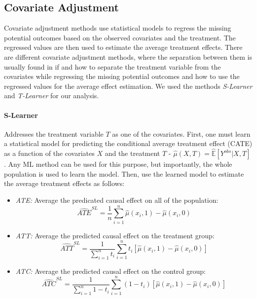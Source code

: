 \documentclass{article}
\begin{document}

\subsection{Covariate Adjustment}
Covariate adjustment methods use statistical models to regress the missing potential outcomes based on the observed covariates and the treatment. The regressed values are then used to estimate the average treatment effects.
There are different covariate adjustment methods, where the separation between them is usually found in if and how to separate the treatment variable from the covariates while regressing the missing potential outcomes and how to use the regressed values for the average effect estimation. We used the methods \emph{S-Learner} and \emph{T-Learner} for our analysis.
\paragraph{S-Learner} Addresses the treatment variable $T$ as one of the covariates. First, one must learn a statistical model for predicting the conditional average treatment effect (CATE) as a function of the covariates $X$ and the treatment $T$ - $\hat{\mu}(X, T) = \hat{\mathbb{E}}[Y^{obs} | X, T]$. Any ML method can be used for this purpose, but importantly, the whole population is used to learn the model. Then, use the learned model to estimate the average treatment effects as follows:

\begin{itemize}
    \item \textit{ATE:} Average the predicated causal effect on all of the population:
    \[
    \widehat{ATE}^{SL} = \frac{1}{n} \sum_{i=1}^{n} \hat{\mu}(x_i, 1) - \hat{\mu}(x_i, 0)
    \]
    \item \textit{ATT:} Average the predicted causal effect on the treatment group:
    \[
    \widehat{ATT}^{SL} = \frac{1}{\sum_{i=1}^{n} t_i} \sum_{i=1}^{n} t_i \left[ \hat{\mu}(x_i, 1) - \hat{\mu}(x_i, 0) \right] 
    \]
    \item \textit{ATC:} Average the predicted causal effect on the control group:
    \[
    \widehat{ATC}^{SL} = \frac{1}{\sum_{i=1}^{n} 1 - t_i} \sum_{i=1}^{n} (1 - t_i) \left[ \hat{\mu}(x_i, 1) - \hat{\mu}(x_i, 0) \right]
    \]
\end{itemize}
\end{document}
